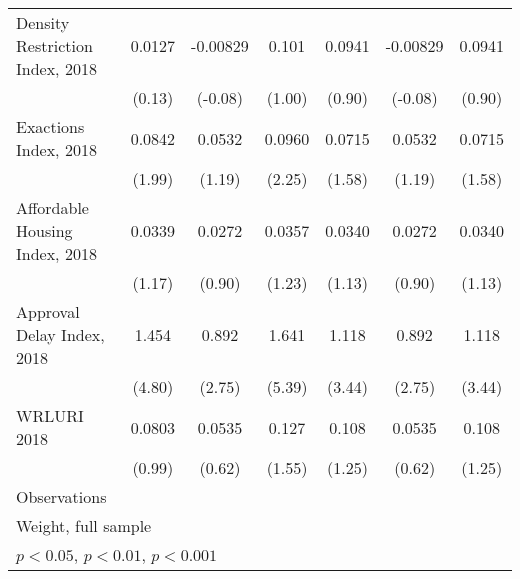 \begin{table}[htbp]
\begin{tabular}{l*{6}{c}}
Density Restriction Index, 2018&      0.0127         &    -0.00829         &       0.101         &      0.0941         &    -0.00829         &      0.0941         \\
                    &      (0.13)         &     (-0.08)         &      (1.00)         &      (0.90)         &     (-0.08)         &      (0.90)         \\
\addlinespace
Exactions Index, 2018&      0.0842\sym{*}  &      0.0532         &      0.0960\sym{*}  &      0.0715         &      0.0532         &      0.0715         \\
                    &      (1.99)         &      (1.19)         &      (2.25)         &      (1.58)         &      (1.19)         &      (1.58)         \\
\addlinespace
Affordable Housing Index, 2018&      0.0339         &      0.0272         &      0.0357         &      0.0340         &      0.0272         &      0.0340         \\
                    &      (1.17)         &      (0.90)         &      (1.23)         &      (1.13)         &      (0.90)         &      (1.13)         \\
\addlinespace
Approval Delay Index, 2018&       1.454\sym{***}&       0.892\sym{**} &       1.641\sym{***}&       1.118\sym{***}&       0.892\sym{**} &       1.118\sym{***}\\
                    &      (4.80)         &      (2.75)         &      (5.39)         &      (3.44)         &      (2.75)         &      (3.44)         \\
\addlinespace
WRLURI 2018         &      0.0803         &      0.0535         &       0.127         &       0.108         &      0.0535         &       0.108         \\
                    &      (0.99)         &      (0.62)         &      (1.55)         &      (1.25)         &      (0.62)         &      (1.25)         \\
\midrule
Observations        &                     &                     &                     &                     &                     &                     \\
\bottomrule
\multicolumn{7}{l}{\footnotesize Weight, full sample}\\
\multicolumn{7}{l}{\footnotesize \sym{*} \(p<0.05\), \sym{**} \(p<0.01\), \sym{***} \(p<0.001\)}\\
\end{tabular}
\end{table}
